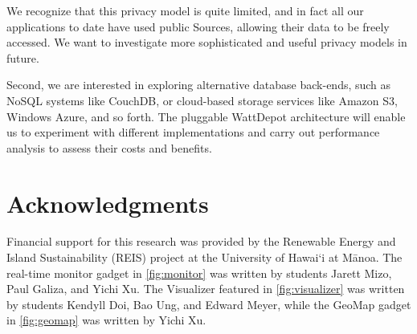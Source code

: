 \documentclass[conference]{IEEEtran}
\begin{document}
We recognize that this privacy model is quite limited, and in fact all our
applications to date have used public Sources, allowing their data to be
freely accessed.  We want to investigate more sophisticated and useful
privacy models in future.

Second, we are interested in exploring alternative database back-ends, such
as NoSQL systems like CouchDB, or cloud-based storage services like Amazon
S3, Windows Azure, and so forth. The pluggable WattDepot architecture will
enable us to experiment with different implementations and carry out
performance analysis to assess their costs and benefits.

\section{Acknowledgments}

Financial support for this research was provided by the Renewable Energy and
Island Sustainability (REIS) project at the University of Hawai`i at M\=anoa.
The real-time monitor gadget in \figurename \ref{fig:monitor} was written by
students Jarett Mizo, Paul Galiza, and Yichi Xu. The Visualizer featured in
\figurename \ref{fig:visualizer} was written by students Kendyll Doi, Bao Ung,
and Edward Meyer, while the GeoMap gadget in \figurename \ref{fig:geomap}
was written by Yichi Xu.



\end{document}
